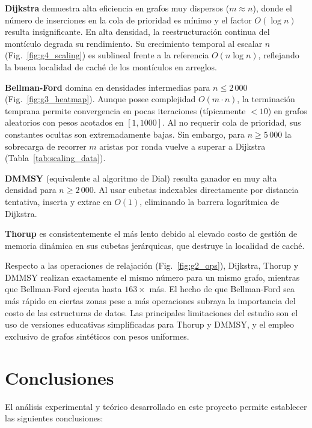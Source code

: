 \documentclass[conference]{IEEEtran}
\begin{document}
\textbf{Dijkstra} demuestra alta eficiencia en grafos muy dispersos ($m \approx n$), donde el número de inserciones en la cola de prioridad es mínimo y el factor $O(\log n)$ resulta insignificante. En alta densidad, la reestructuración continua del montículo degrada su rendimiento. Su crecimiento temporal al escalar $n$ (Fig.~\ref{fig:g4_scaling}) es sublineal frente a la referencia $O(n\log n)$, reflejando la buena localidad de caché de los montículos en arreglos.

\textbf{Bellman-Ford} domina en densidades intermedias para $n \leq 2\,000$ (Fig.~\ref{fig:g3_heatmap}). Aunque posee complejidad $O(m \cdot n)$, la terminación temprana permite convergencia en pocas iteraciones (típicamente $<10$) en grafos aleatorios con pesos acotados en $[1, 1000]$. Al no requerir cola de prioridad, sus constantes ocultas son extremadamente bajas. Sin embargo, para $n \geq 5\,000$ la sobrecarga de recorrer $m$ aristas por ronda vuelve a superar a Dijkstra (Tabla~\ref{tab:scaling_data}).

\textbf{DMMSY} (equivalente al algoritmo de Dial) resulta ganador en muy alta densidad para $n \geq 2\,000$. Al usar cubetas indexables directamente por distancia tentativa, inserta y extrae en $O(1)$, eliminando la barrera logarítmica de Dijkstra.

\textbf{Thorup} es consistentemente el más lento debido al elevado costo de gestión de memoria dinámica en sus cubetas jerárquicas, que destruye la localidad de caché.

Respecto a las operaciones de relajación (Fig.~\ref{fig:g2_ops}), Dijkstra, Thorup y DMMSY realizan exactamente el mismo número para un mismo grafo, mientras que Bellman-Ford ejecuta hasta $163\times$ más. El hecho de que Bellman-Ford sea más rápido en ciertas zonas pese a más operaciones subraya la importancia del costo de las estructuras de datos. Las principales limitaciones del estudio son el uso de versiones educativas simplificadas para Thorup y DMMSY, y el empleo exclusivo de grafos sintéticos con pesos uniformes.

\section{Conclusiones}

El análisis experimental y teórico desarrollado en este proyecto permite establecer las siguientes conclusiones:
\end{document}
